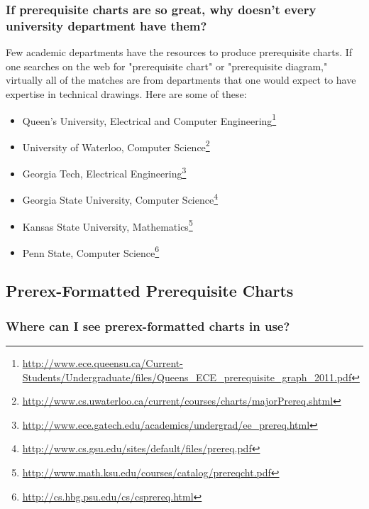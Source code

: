 \documentclass[11pt]{article}
\newcommand{\myurl}[1]{\textcolor{blue}{\underline{\textcolor{black}{\url{#1}}}}}
\begin{document}
\subsubsection*{If prerequisite charts are so great, why doesn't every university department have them?}
Few academic departments have the resources to produce prerequisite charts. If
one searches on the web for "prerequisite chart" or "prerequisite diagram," 
virtually all of the matches are from departments that one would
expect to have expertise in technical drawings.
Here are some of these:
\begin{itemize}
\item Queen's University, Electrical and Computer Engineering\footnote{%
\myurl{http://www.ece.queensu.ca/Current-Students/Undergraduate/files/Queens_ECE_prerequisite_graph_2011.pdf}}
\item University of Waterloo, Computer Science\footnote{%
\myurl{http://www.cs.uwaterloo.ca/current/courses/charts/majorPrereq.shtml}}
\item Georgia Tech, Electrical Engineering\footnote{%
\myurl{http://www.ece.gatech.edu/academics/undergrad/ee_prereq.html}}
\item Georgia State University, Computer Science\footnote{%
\myurl{http://www.cs.gsu.edu/sites/default/files/prereq.pdf}}
\item Kansas State University, Mathematics\footnote{%
\myurl{http://www.math.ksu.edu/courses/catalog/prereqcht.pdf}}
\item Penn State, Computer Science\footnote{%
\myurl{http://cs.hbg.psu.edu/cs/csprereq.html}}
\end{itemize}

\subsection{Prerex-Formatted  Prerequisite Charts}

\subsubsection*{Where can I see prerex-formatted charts in use?}
\end{document}
